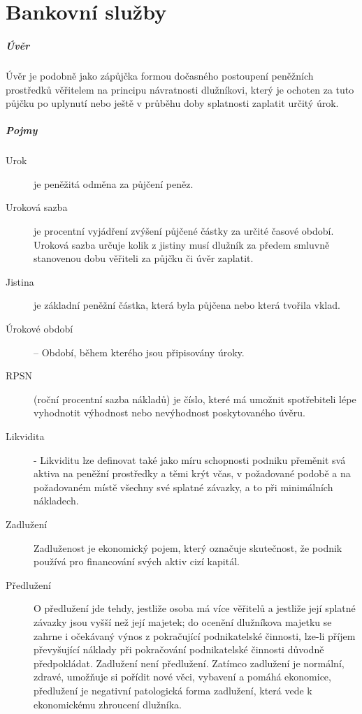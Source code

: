 \chapter{Bankovní služby}

\paragraph{Úvěr}
Úvěr je podobně jako zápůjčka formou dočasného postoupení peněžních prostředků věřitelem na principu návratnosti dlužníkovi, který je ochoten za tuto půjčku po uplynutí nebo ještě v průběhu doby splatnosti zaplatit určitý úrok.

\paragraph{Pojmy}
\begin{description}
    \item[Urok] je peněžitá odměna za půjčení peněz.
    \item[Uroková sazba] je procentní vyjádření zvýšení půjčené částky za určité časové období. Uroková sazba určuje kolik z jistiny musí dlužník za předem smluvně stanovenou dobu věřiteli za půjčku či úvěr zaplatit.
    \item[Jistina] je základní peněžní částka, která byla půjčena nebo která tvořila vklad.
    \item[Úrokové období] -- Období, během kterého jsou připisovány úroky.
    \item[RPSN] (roční procentní sazba nákladů) je číslo, které má umožnit spotřebiteli lépe vyhodnotit výhodnost nebo nevýhodnost poskytovaného úvěru.
    \item[Likvidita] - Likviditu lze definovat také jako míru schopnosti podniku přeměnit svá aktiva na peněžní prostředky a těmi krýt včas, v požadované podobě a na požadovaném místě všechny své splatné závazky, a to při minimálních nákladech.
    \item[Zadlužení] Zadluženost je ekonomický pojem, který označuje skutečnost, že podnik používá pro financování svých aktiv cizí kapitál.
    \item[Předlužení] O předlužení jde tehdy, jestliže osoba má více věřitelů a jestliže její splatné závazky jsou vyšší než její majetek; do ocenění dlužníkova majetku se zahrne i očekávaný výnos z pokračující podnikatelské činnosti, lze-li příjem převyšující náklady při pokračování podnikatelské činnosti důvodně předpokládat. Zadlužení není předlužení. Zatímco zadlužení je normální, zdravé, umožňuje si pořídit nové věci, vybavení a pomáhá ekonomice, předlužení je negativní patologická forma zadlužení, která vede k ekonomickému zhroucení dlužníka.

\end{description}
